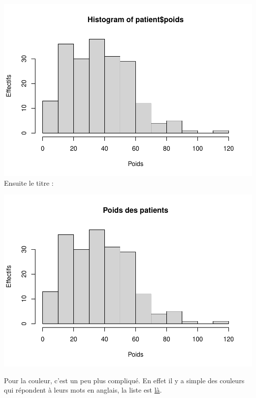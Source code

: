 \documentclass[
]{book}
\newenvironment{Shaded}{\begin{snugshade}}{\end{snugshade}}
\newcommand{\AttributeTok}[1]{\textcolor[rgb]{0.13,0.29,0.53}{#1}}
\newcommand{\FunctionTok}[1]{\textcolor[rgb]{0.13,0.29,0.53}{\textbf{#1}}}
\newcommand{\NormalTok}[1]{#1}
\newcommand{\SpecialCharTok}[1]{\textcolor[rgb]{0.81,0.36,0.00}{\textbf{#1}}}
\newcommand{\StringTok}[1]{\textcolor[rgb]{0.31,0.60,0.02}{#1}}
\begin{document}
\includegraphics{_main_files/figure-latex/poids2-1.pdf}
Ensuite le titre :

\begin{Shaded}
\end{Shaded}

\includegraphics{_main_files/figure-latex/poids3-1.pdf}

Pour la couleur, c'est un peu plus compliqué. En effet il y a simple des couleurs
qui répondent à leurs mots en anglais, la liste est \href{https://www.datanovia.com/en/blog/awesome-list-of-657-r-color-names/}{là}.
\end{document}
